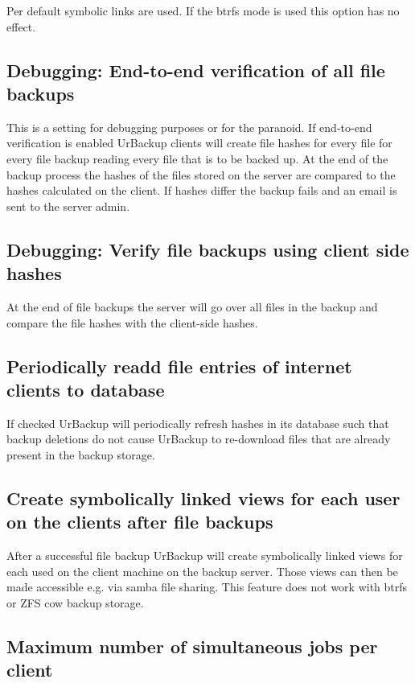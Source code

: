 \documentclass[a4paper,10pt]{article}
\begin{document}
Per default symbolic links are used. If the btrfs mode is used this option has no effect.

\subsection{Debugging: End-to-end verification of all file backups}

This is a setting for debugging purposes or for the paranoid. If end-to-end verification is enabled UrBackup clients
will create file hashes for every file for every file backup reading every file that is to be backed up. At the end
of the backup process the hashes of the files stored on the server are compared to the hashes calculated on the client.
If hashes differ the backup fails and an email is sent to the server admin.

\subsection{Debugging: Verify file backups using client side hashes}

At the end of file backups the server will go over all files in the backup and compare the file hashes with the
client-side hashes.

\subsection{Periodically readd file entries of internet clients to database}

If checked UrBackup will periodically refresh hashes in its database such that backup deletions do not cause UrBackup to re-download files that are already present in the backup storage.

\subsection{Create symbolically linked views for each user on the clients after file backups}

After a successful file backup UrBackup will create symbolically linked views for each used on the client machine on the backup server.
Those views can then be made accessible e.g. via samba file sharing.
This feature does not work with btrfs or ZFS cow backup storage.

\subsection{Maximum number of simultaneous jobs per client}
\end{document}
